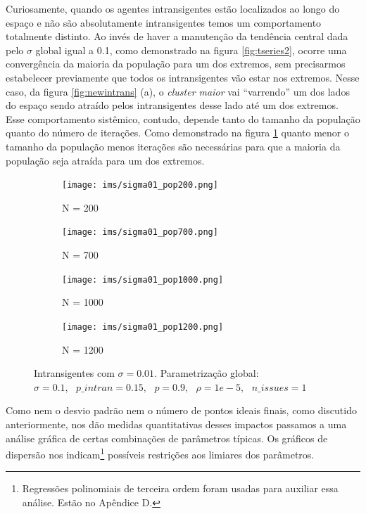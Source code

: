      Curiosamente, quando os agentes intransigentes estão localizados ao longo
     do espaço e não são absolutamente intransigentes temos um comportamento
     totalmente distinto. Ao invés de haver a manutenção da tendência central
     dada pelo \(\sigma\) global igual a 0.1, como demonstrado na figura
     \ref{fig:tseries2}, ocorre uma convergência da maioria da população para um
     dos extremos, sem precisarmos estabelecer previamente que todos os
     intransigentes vão estar nos extremos. Nesse caso, da figura
     \ref{fig:newintrans} (a), o \textit{cluster maior} vai ``varrendo'' um dos
     lados do espaço sendo atraído pelos  intransigentes desse lado até um dos extremos.
     Esse comportamento sistêmico, contudo, depende tanto do tamanho da
     população quanto do número de iterações. Como demonstrado na figura
     \ref{fig:newintrans2} quanto menor o tamanho da população menos iterações
     são necessárias para que a maioria da população seja atraída para um dos
     extremos.
  \begin{figure}[H]
    \centering
    \begin{subfigure}[b]{0.49\textwidth}
      \texttt{[image: ims/sigma01\_pop200.png]}
      \caption{N = 200}
    \end{subfigure}
    \begin{subfigure}[b]{0.49\textwidth}
      \texttt{[image: ims/sigma01\_pop700.png]}
       \caption{N = 700}
     \end{subfigure}

         \begin{subfigure}[b]{0.49\textwidth}
      \texttt{[image: ims/sigma01\_pop1000.png]}
       \caption{N = 1000}
     \end{subfigure}
         \begin{subfigure}[b]{0.49\textwidth}
      \texttt{[image: ims/sigma01\_pop1200.png]}
       \caption{N = 1200}
     \end{subfigure}

     \caption{ Intransigentes com \(\sigma = 0.01\). Parametrização global: \( \sigma =
       0.1, \text{ } p\_intran = 0.15, \text{ } p = 0.9,
       \text{ } \rho = 1e-5, \text{ } n\_issues = 1 \)}
    \label{fig:newintrans2}
     \end{figure}
  

  
    Como nem o desvio padrão nem o número de pontos ideais finais,
    como discutido anteriormente, nos dão medidas quantitativas desses impactos
    passamos a uma análise gráfica de certas combinações de parâmetros típicas.
    Os gráficos de dispersão nos indicam\footnote{Regressões polinomiais de
      terceira ordem foram usadas para auxiliar essa análise. Estão no
      Apêndice D.} possíveis restrições aos limiares dos parâmetros.


